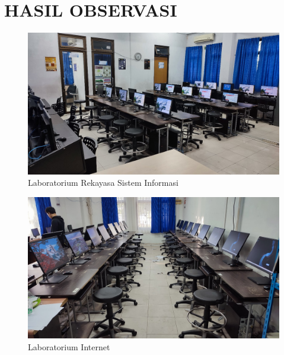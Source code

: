 %
%
%
%


\renewcommand{\thepage}{B - \arabic{page}}
\chapter{HASIL OBSERVASI}
\begin{figure}
	\centering
	\includegraphics[width=0.82\linewidth]{konten/gambar/lab-rsi.jpg}
	\caption{Laboratorium Rekayasa Sistem Informasi \protect\cite{labsi2023}}
	\label{fig:lab-rsi}
\end{figure}

\begin{figure}
	\centering
	\includegraphics[width=0.82\linewidth]{konten/gambar/lab-internet.jpg}
	\caption{Laboratorium Internet \protect\cite{labsi2023}}
	\label{fig:lab-int}
\end{figure}

